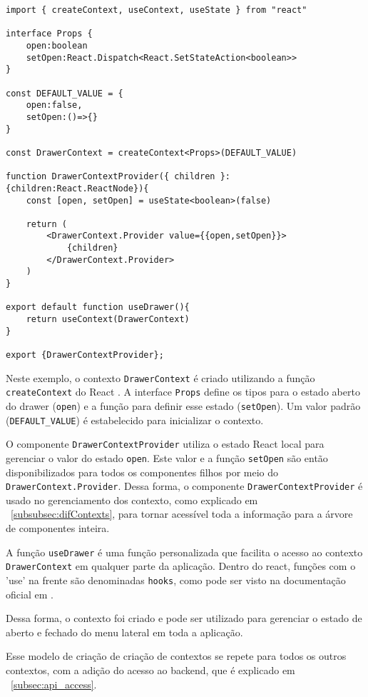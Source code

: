 \begin{verbatim}
import { createContext, useContext, useState } from "react"

interface Props {
    open:boolean
    setOpen:React.Dispatch<React.SetStateAction<boolean>>
}

const DEFAULT_VALUE = {
    open:false,
    setOpen:()=>{}
}

const DrawerContext = createContext<Props>(DEFAULT_VALUE)

function DrawerContextProvider({ children }:{children:React.ReactNode}){
    const [open, setOpen] = useState<boolean>(false)

    return (
        <DrawerContext.Provider value={{open,setOpen}}>
            {children}
        </DrawerContext.Provider>
    )
}

export default function useDrawer(){
    return useContext(DrawerContext)
}

export {DrawerContextProvider};
\end{verbatim}

Neste exemplo, o contexto \texttt{DrawerContext} é criado utilizando a função \texttt{createContext} do React \cite{reactCreateContext}. A interface \texttt{Props} define os tipos para o estado aberto do drawer (\texttt{open}) e a função para definir esse estado (\texttt{setOpen}). Um valor padrão (\texttt{DEFAULT\_VALUE}) é estabelecido para inicializar o contexto. 

O componente \texttt{DrawerContextProvider} utiliza o estado React local para gerenciar o valor do estado \texttt{open}. Este valor e a função \texttt{setOpen} são então disponibilizados para todos os componentes filhos por meio do \texttt{DrawerContext.Provider}. Dessa forma, o componente \texttt{DrawerContextProvider} é usado no gerenciamento dos contexto, como explicado em ~\ref{subsubsec:difContexts}, para tornar acessível toda a informação para a árvore de componentes inteira.

A função \texttt{useDrawer} é uma função personalizada que facilita o acesso ao contexto \texttt{DrawerContext} em qualquer parte da aplicação. Dentro do react, funções com o 'use' na frente são denominadas \texttt{hooks}, como pode ser visto na documentação oficial em \cite{reactHooksReference}. 

Dessa forma, o contexto foi criado e pode ser utilizado para gerenciar o estado de aberto e fechado do menu lateral em toda a aplicação.

Esse modelo de criação de criação de contextos se repete para todos os outros contextos, com a adição do acesso ao backend, que é explicado em ~\ref{subsec:api_access}.

